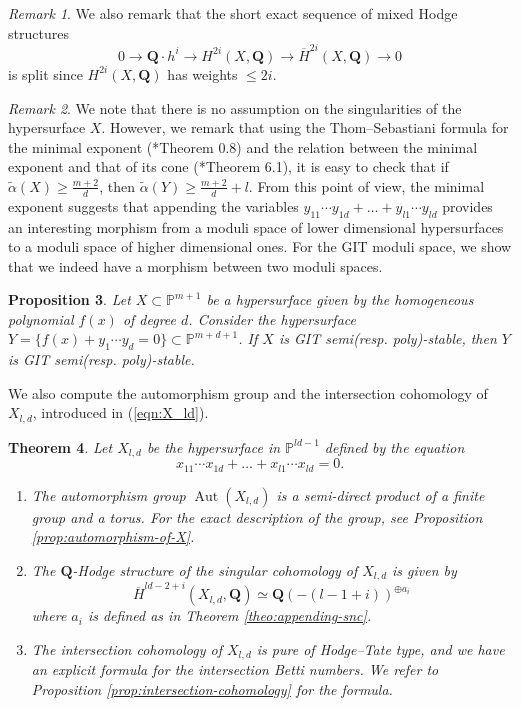 \documentclass[letterpaper,11pt]{amsart}
\theoremstyle{plain}
\newtheorem{theo}{Theorem}[section]
\newtheorem{prop}[theo]{Proposition}
\theoremstyle{definition}
\theoremstyle{remark}
\newtheorem{rema}[theo]{Remark}
\newcommand{\PP}{\mathbb{P}}
\newcommand{\QQ}{\mathbf{Q}}
\DeclareMathOperator{\Aut}{Aut}
\begin{document}
    \begin{rema}
        We also remark that the short exact sequence of mixed Hodge structures
        $$ 0 \to \QQ \cdot h^{i} \to H^{2i}(X, \QQ) \to \overline{H}^{2i}(X, \QQ) \to 0 $$
        is split since $H^{2i}(X, \QQ)$ has weights $\leq 2i$.
    \end{rema}

    \begin{rema}
        We note that there is no assumption on the singularities of the hypersurface $X$. However, we remark that using the Thom--Sebastiani formula for the minimal exponent (\cite{Saito-microlocal-b-function}*{Theorem 0.8}) and the relation between the minimal exponent and that of its cone (\cite{park2025git}*{Theorem 6.1}), it is easy to check that if $\widetilde{\alpha}(X) \geq \frac{m+2}{d}$, then $\widetilde{\alpha}(Y) \geq \frac{m + 2}{d} + l$. From this point of view, the minimal exponent suggests that appending the variables $y_{11}\cdots y_{1d} + \ldots + y_{l1}\cdots y_{ld}$ provides an interesting morphism from a moduli space of lower dimensional hypersurfaces to a moduli space of higher dimensional ones. For the GIT moduli space, we show that we indeed have a morphism between two moduli spaces.
    \end{rema}

    \begin{prop} \label{prop:appending-snc-preserves-GIT}
        Let $X \subset \PP^{m+1}$ be a hypersurface given by the homogeneous polynomial $f(x)$ of degree $d$. Consider the hypersurface $Y = \{ f(x) + y_{1}\cdots y_{d} = 0\}\subset \PP^{m+d+1}$. If $X$ is GIT semi(resp.\! poly)-stable, then $Y$ is GIT semi(resp.\! poly)-stable.
    \end{prop}


    We also compute the automorphism group and the intersection cohomology of $X_{l,d}$, introduced in (\ref{eqn:X_ld}).

    \begin{theo}\label{theo:main-theorem}
        Let $X_{l,d}$ be the hypersurface in $\PP^{ld-1}$ defined by the equation
        $$ x_{11} \cdots x_{1d} + \ldots + x_{l1}\cdots x_{ld} = 0.$$
        \begin{enumerate}
            \item The automorphism group $\Aut(X_{l,d})$ is a semi-direct product of a finite group and a torus. For the exact description of the group, see Proposition \ref{prop:automorphism-of-X}.
            \item The $\QQ$-Hodge structure of the singular cohomology of $X_{l,d}$ is given by
            $$ \overline{H}^{ld-2+i}(X_{l,d}, \QQ) \simeq \QQ(-(l-1+i))^{\oplus a_{i}}$$
            where $a_{i}$ is defined as in Theorem \ref{theo:appending-snc}.
            \item The intersection cohomology of $X_{l,d}$ is pure of Hodge--Tate type, and we have an explicit formula for the intersection Betti numbers.  We refer to Proposition \ref{prop:intersection-cohomology} for the formula.
        \end{enumerate}
    \end{theo}
\end{document}
